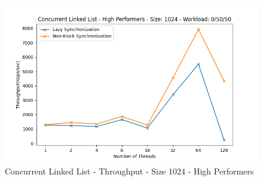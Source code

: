 \documentclass[../final_report.tex]{subfiles}
\begin{document}
\begin{figure}[H]
        \includegraphics[scale=0.4]{outFiles/plots/concurrent_data_structs_high_1024_0_50_50.png}
    \caption{Concurrent Linked List - Throughput - Size 1024 - High Performers}
    \label{fig:Concurrent Linked List - Throughput - Size 1024 - High Performers}
\end{figure}
\end{document}
